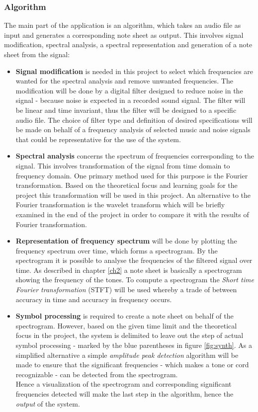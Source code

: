 \subsubsection{Algorithm}
The main part of the application is an algorithm, which takes an audio file as input and generates a corresponding note sheet as output. This involves signal modification, spectral analysis, a spectral representation and generation of a note sheet from the signal:
\begin{itemize}
\item[] \textbf{Signal modification} is needed in this project to select which frequencies are wanted for the spectral analysis and remove unwanted frequencies. The modification will be done by a digital filter designed to reduce noise in the signal - because noise is expected in a recorded sound signal. The filter will be linear and time invariant, thus the filter will be designed to a specific audio file. The choice of filter type and definition of desired specifications will be made on behalf of a frequency analysis of selected music and noise signals that could be representative for the use of the system.             
\item[] \textbf{Spectral analysis} concerns the spectrum of frequencies corresponding to the signal. This involves transformation of the signal from time domain to frequency domain.     
One primary method used for this purpose is the Fourier transformation. Based on the theoretical focus and learning goals for the project this transformation will be used in this project. An alternative to the Fourier transformation is the wavelet transform which will be briefly examined in the end of the project in order to compare it with the results of Fourier transformation.  
\item[] \textbf{Representation of frequency spectrum} will be done by plotting the frequency spectrum over time, which forms a spectrogram. By the spectrogram it is possible to analyse the frequencies of the filtered signal over time. As described in chapter \ref{ch2} a note sheet is basically a spectrogram showing the frequency of the tones. To compute a spectrogram the \textit{Short time Fourier transformation} (STFT) will be used whereby a trade of between accuracy in time and accuracy in frequency occurs.  

\item[] \textbf{Symbol processing} is required to create a note sheet on behalf of the spectrogram. 
However, based on the given time limit and the theoretical focus in the project, the system is delimited to leave out the step of actual symbol processing - marked by the blue parentheses in figure \ref{fig:synth}. As a simplified alternative a simple \textit{amplitude peak detection} algorithm will be made to ensure that the significant frequencies - which makes a tone or cord recognizable - can be detected from the spectrogram. \\       
Hence a visualization of the spectrogram and corresponding significant frequencies detected will make the last step in the algorithm, hence the \textit{output} of the system.
\end{itemize}

